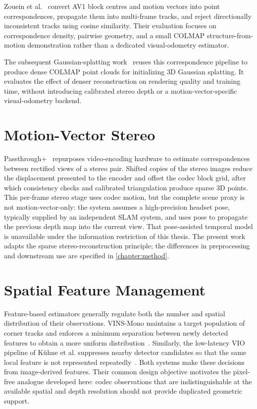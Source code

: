 Zouein et al.~\cite{zouein2025leveraging} convert AV1 block centres and motion vectors into point correspondences, propagate them into multi-frame tracks, and reject directionally inconsistent tracks using cosine similarity. Their evaluation focuses on correspondence density, pairwise geometry, and a small COLMAP structure-from-motion demonstration rather than a dedicated visual-odometry estimator.

The subsequent Gaussian-splatting work~\cite{zouein2026efficient} reuses this
correspondence pipeline to produce dense COLMAP point clouds for initializing 3D
Gaussian splatting. It evaluates the effect of denser reconstruction on
rendering quality and training time, without introducing calibrated stereo depth
or a motion-vector-specific visual-odometry backend.

\section{Motion-Vector Stereo}

Passthrough+~\cite{chaurasia2020passthrough} repurposes video-encoding hardware
to estimate correspondences between rectified views of a stereo pair. Shifted
copies of the stereo images reduce the displacement presented to the encoder
and offset the codec block grid, after which consistency checks and calibrated
triangulation produce sparse 3D points. This per-frame stereo stage uses codec
motion, but the complete scene proxy is not motion-vector-only: the system
assumes a high-precision headset pose, typically supplied by an independent
SLAM system, and uses pose to propagate the previous depth map into the current
view. That pose-assisted temporal model is unavailable under the information
restriction of this thesis. The present work adapts the sparse
stereo-reconstruction principle; the differences in preprocessing and downstream
use are specified in \autoref{chapter:method}.

\section{Spatial Feature Management}

Feature-based estimators generally regulate both the number and spatial
distribution of their observations. VINS-Mono maintains a target population of
corner tracks and enforces a minimum separation between newly detected features
to obtain a more uniform distribution~\cite{qin2018vins}. Similarly, the
low-latency VIO pipeline of K\"uhne et al. suppresses nearby detector candidates
so that the same local feature is not represented repeatedly~\cite{kuhne2025lowlatency}.
Both systems make these decisions from image-derived features. Their common
design objective motivates the pixel-free analogue developed here: codec
observations that are indistinguishable at the available spatial and depth
resolution should not provide duplicated geometric support.

